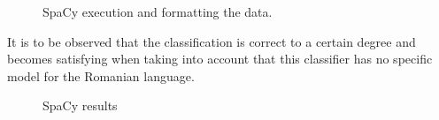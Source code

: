 \documentclass[12pt,a4paper]{article}
\begin{document}
\begin{figure}[h!]
\begin{center}
\end{center}
\caption{SpaCy execution and formatting the data.}
\end{figure}

\qquad It is to be observed that the classification is correct to a certain degree and becomes satisfying when taking into account that this classifier has no specific model for the Romanian language.

\begin{figure}[h!]
\begin{center}
\end{center}
\caption{SpaCy results}
\end{figure}
\end{document}
